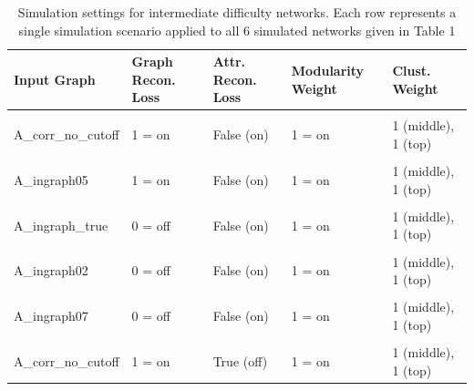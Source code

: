 \documentclass[
]{article}
\begin{document}
\clearpage
\newpage
\begingroup\fontsize{10}{12}\selectfont
\begingroup\fontsize{10}{12}\selectfont

\begin{longtable}[t]{>{\raggedright\arraybackslash}p{8em}llll}
\caption{\label{tab:unnamed-chunk-6}Simulation settings for intermediate difficulty networks. Each row represents a single simulation scenario applied to all 6 simulated networks given in Table 1}\\
\toprule
Input Graph & Graph Recon. Loss & Attr. Recon. Loss & Modularity Weight & Clust. Weight\\
\midrule
\cellcolor{gray!10}{A\_ingraph\_true} & \cellcolor{gray!10}{1 = on} & \cellcolor{gray!10}{False (on)} & \cellcolor{gray!10}{1 = on} & \cellcolor{gray!10}{1 (middle), 1 (top)}\\
A\_corr\_no\_cutoff & 1 = on & False (on) & 1 = on & 1 (middle), 1 (top)\\
\cellcolor{gray!10}{A\_ingraph02} & \cellcolor{gray!10}{1 = on} & \cellcolor{gray!10}{False (on)} & \cellcolor{gray!10}{1 = on} & \cellcolor{gray!10}{1 (middle), 1 (top)}\\
A\_ingraph05 & 1 = on & False (on) & 1 = on & 1 (middle), 1 (top)\\
\cellcolor{gray!10}{A\_ingraph07} & \cellcolor{gray!10}{1 = on} & \cellcolor{gray!10}{False (on)} & \cellcolor{gray!10}{1 = on} & \cellcolor{gray!10}{1 (middle), 1 (top)}\\
\addlinespace
A\_ingraph\_true & 0 = off & False (on) & 1 = on & 1 (middle), 1 (top)\\
\cellcolor{gray!10}{A\_corr\_no\_cutoff} & \cellcolor{gray!10}{0 = off} & \cellcolor{gray!10}{False (on)} & \cellcolor{gray!10}{1 = on} & \cellcolor{gray!10}{1 (middle), 1 (top)}\\
A\_ingraph02 & 0 = off & False (on) & 1 = on & 1 (middle), 1 (top)\\
\cellcolor{gray!10}{A\_ingraph05} & \cellcolor{gray!10}{0 = off} & \cellcolor{gray!10}{False (on)} & \cellcolor{gray!10}{1 = on} & \cellcolor{gray!10}{1 (middle), 1 (top)}\\
A\_ingraph07 & 0 = off & False (on) & 1 = on & 1 (middle), 1 (top)\\
\addlinespace
\cellcolor{gray!10}{A\_ingraph\_true} & \cellcolor{gray!10}{1 = on} & \cellcolor{gray!10}{True (off)} & \cellcolor{gray!10}{1 = on} & \cellcolor{gray!10}{1 (middle), 1 (top)}\\
A\_corr\_no\_cutoff & 1 = on & True (off) & 1 = on & 1 (middle), 1 (top)\\

\end{longtable}
\end{document}
